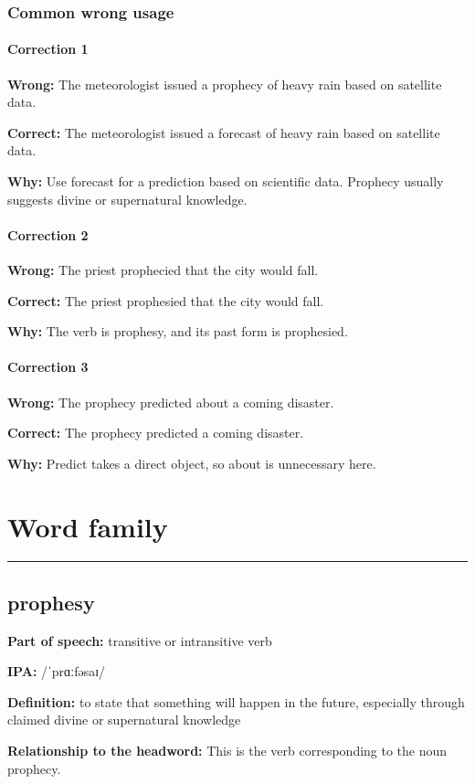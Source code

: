 \documentclass[11pt]{article}
\newcommand{\sectionrule}{\par\vspace{-0.5em}\noindent\textcolor{Accent}{\rule{\linewidth}{0.6pt}}\par}
\begin{document}
\subsubsection{Common wrong usage}
\paragraph{Correction 1}
\textbf{Wrong:} The meteorologist issued a prophecy of heavy rain based on satellite data.

\textbf{Correct:} The meteorologist issued a forecast of heavy rain based on satellite data.

\textbf{Why:} Use forecast for a prediction based on scientific data. Prophecy usually suggests divine or supernatural knowledge.

\paragraph{Correction 2}
\textbf{Wrong:} The priest prophecied that the city would fall.

\textbf{Correct:} The priest prophesied that the city would fall.

\textbf{Why:} The verb is prophesy, and its past form is prophesied.

\paragraph{Correction 3}
\textbf{Wrong:} The prophecy predicted about a coming disaster.

\textbf{Correct:} The prophecy predicted a coming disaster.

\textbf{Why:} Predict takes a direct object, so about is unnecessary here.

\section{Word family}
\sectionrule
\subsection{prophesy}
\textbf{Part of speech:} transitive or intransitive verb

\textbf{IPA:} /ˈprɑːfəsaɪ/

\textbf{Definition:} to state that something will happen in the future, especially through claimed divine or supernatural knowledge

\textbf{Relationship to the headword:} This is the verb corresponding to the noun prophecy.
\end{document}
